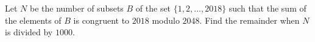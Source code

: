 Let $N$ be the number of subsets $B$ of the set $\{1,2,\dots,2018\}$ such that the sum of the elements of $B$ is congruent to $2018$ modulo $2048$. Find the remainder when $N$ is divided by $1000$.